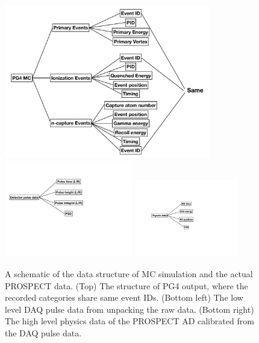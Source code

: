 \begin{figure}[h!]
    \centering
    \includegraphics[width=0.8\textwidth]{Figures/MCStructure.pdf}\\
    \includegraphics[width=0.5\textwidth]{Figures/PulseStructure.pdf}
	\includegraphics[width=0.4\textwidth]{Figures/PhysStructure.pdf}\\
	\caption[The data structure of MC simulation and PROSPECT data]{
	A schematic of the data structure of MC simulation and the actual PROSPECT data. 
	(Top) The structure of PG4 output, where the recorded categories share same event IDs.
	(Bottom left) The low level DAQ pulse data from unpacking the raw data. 
	(Bottom right) The high level physics data of the PROSPECT AD calibrated from the DAQ pulse data. 
    }
    \label{fig:MCstructure}
\end{figure}

